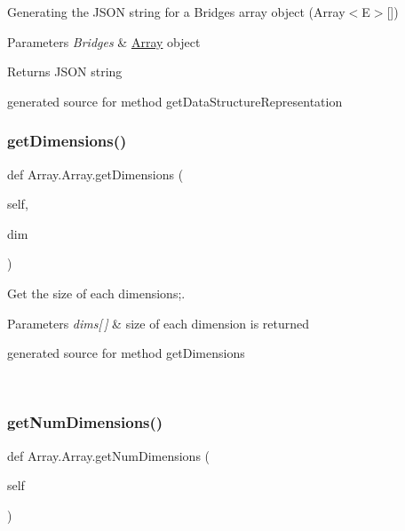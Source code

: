 Generating the J\+S\+ON string for a Bridges array object (Array$<$\+E$>$\mbox{[}\mbox{]}) 


\begin{DoxyParams}{Parameters}
{\em Bridges} & \hyperlink{class_array_1_1_array}{Array} object\\
\hline
\end{DoxyParams}
\begin{DoxyReturn}{Returns}
J\+S\+ON string\begin{DoxyVerb}generated source for method getDataStructureRepresentation \end{DoxyVerb}
 
\end{DoxyReturn}
\hypertarget{class_array_1_1_array_aafd492514af99656f08d4bec38b25ffc}{}\label{class_array_1_1_array_aafd492514af99656f08d4bec38b25ffc} 
\subsubsection{\texorpdfstring{get\+Dimensions()}{getDimensions()}}
{\footnotesize\ttfamily def Array.\+Array.\+get\+Dimensions (\begin{DoxyParamCaption}\item[{}]{self,  }\item[{}]{dim }\end{DoxyParamCaption})}



Get the size of each dimensions;. 


\begin{DoxyParams}{Parameters}
{\em dims\mbox{[}$\,$\mbox{]}} & size of each dimension is returned\begin{DoxyVerb}generated source for method getDimensions \end{DoxyVerb}
 \\
\hline
\end{DoxyParams}
\hypertarget{class_array_1_1_array_a713b383572b6cd307aafa8ebea7a8889}{}\label{class_array_1_1_array_a713b383572b6cd307aafa8ebea7a8889} 
\subsubsection{\texorpdfstring{get\+Num\+Dimensions()}{getNumDimensions()}}
{\footnotesize\ttfamily def Array.\+Array.\+get\+Num\+Dimensions (\begin{DoxyParamCaption}\item[{}]{self }\end{DoxyParamCaption})}



